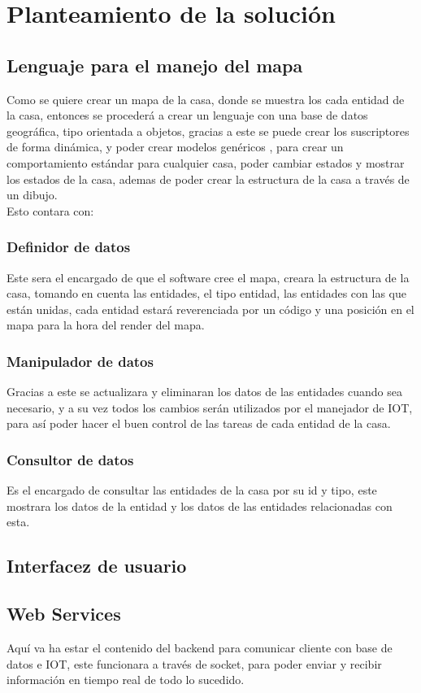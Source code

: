 \section{Planteamiento de la solución}
\subsection{Lenguaje para el manejo del mapa}
Como se quiere crear un mapa de la casa, donde se muestra los cada entidad de la casa, entonces se procederá a crear un lenguaje con una base de datos geográfica, tipo orientada a objetos, gracias a este se puede crear los suscriptores de forma dinámica, y poder crear modelos genéricos , para crear un comportamiento estándar para cualquier casa, poder cambiar estados y mostrar los estados de la casa, ademas de poder crear la estructura de la casa a través de un dibujo.\\
Esto contara con:
\subsubsection{Definidor de datos}
Este sera el encargado de que el software cree el mapa, creara la estructura de la casa, tomando en cuenta las entidades, el tipo entidad, las entidades con las que están unidas, cada entidad estará reverenciada por un código y una posición en el mapa para la hora del render del mapa.
\subsubsection{Manipulador de datos}
Gracias a este se actualizara y eliminaran los datos de las entidades cuando sea necesario, y a su vez todos los cambios serán utilizados por el manejador de IOT, para así poder hacer el buen control de las tareas de cada entidad de la casa.
\subsubsection{Consultor de datos}
Es el encargado de consultar las entidades de la casa por su id y tipo, este mostrara los datos de la entidad  y los datos de las entidades relacionadas con esta.

\subsection{Interfacez de usuario}
\subsection{Web Services}
Aquí va ha estar el contenido del backend para comunicar cliente con base de datos e IOT, este funcionara a través de socket, para poder enviar  y recibir información en tiempo real de todo lo sucedido.
